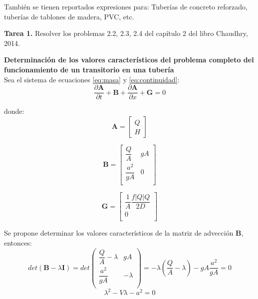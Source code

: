 \documentclass[letterpaper]{report}
\begin{document}
También se tienen reportados expresiones para: Tuberías de concreto reforzado, tuberías de tablones de madera, PVC, etc.\bigskip

\textbf{Tarea 1.} Resolver los problemas 2.2, 2.3, 2.4 del capítulo 2 del libro Chaudhry, 2014.\bigskip

\begin{mdframed}[backgroundcolor=verdeclaro]
\textbf{Determinación de los valores característicos del problema completo del funcionamiento de un transitorio en una tubería}\\ 

Sea el sistema de ecuaciones \ref{eq:masa} y \ref{eq:continuidad}:
\begin{equation*}
	\frac{\partial \mathbf{A}}{\partial t}+\mathbf{B}+\frac{\partial \mathbf{A}}{\partial x}+\mathbf{G} = 0
\end{equation*}	

donde:
\begin{equation*}
	\mathbf{A}= 
	\begin{bmatrix*}
		Q\\
		H
	\end{bmatrix*}
\end{equation*}

\begin{equation*}
	\mathbf{B}= 
	\begin{bmatrix*}
		\dfrac{Q}{A} & gA\\
		\dfrac{a^2}{gA} & 0 \\
	\end{bmatrix*}
\end{equation*}

\begin{equation*}
	\mathbf{G}= 
	\begin{bmatrix*}
		\dfrac{1}{A}\dfrac{f|Q|Q}{2D} \\
		 0 \\
	\end{bmatrix*}
\end{equation*}

Se propone determinar los valores característicos de la matriz de advección $\mathbf{B}$, entonces:
\begin{equation*}
	det(\mathbf{B}-\lambda\mathbf{I}) = det\left(
	\begin{matrix}
		\dfrac{Q}{A}-\lambda &gA \\
		\dfrac{a^2}{gA} &-\lambda\\
	\end{matrix}
	\right) = -\lambda\left(\dfrac{Q}{A}-\lambda\right)-gA\dfrac{a^2}{gA}=0
\end{equation*}
\begin{equation*}
	\lambda^2-V \lambda-a^2=0
\end{equation*}


\end{mdframed}
\end{document}
